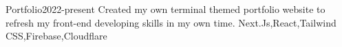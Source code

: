 
\begin{projects}
    \project
	{Portfolio}{2022-present}
	{}
	{Created my own terminal themed portfolio website to refresh my front-end developing skills in my own time.}
	{Next.Js,React,Tailwind CSS,Firebase,Cloudflare}
\end{projects}